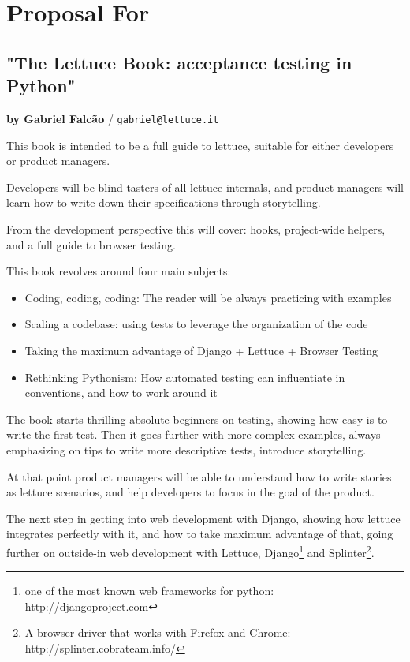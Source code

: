 \documentclass[letterpaper]{article}
\begin{document}
\section*{Proposal For}

\subsection*{"The Lettuce Book: acceptance testing in Python"}
\normalsize\textbf{by Gabriel Falcão} \large{/} \texttt{gabriel@lettuce.it}

\normalsize

This book is intended to be a full guide to lettuce, suitable for
either developers or product managers.

\noindent
Developers will be blind tasters of all lettuce internals, and product
managers will learn how to write down their specifications through
storytelling.

\noindent
From the development perspective this will cover: hooks, project-wide
helpers, and a full guide to browser testing.

\noindent
This book revolves around four main subjects:

\begin{itemize}

\item{Coding, coding, coding: The reader will be always practicing with examples}

\item{Scaling a codebase: using tests to leverage the organization of the code}

\item{Taking the maximum advantage of Django + Lettuce + Browser Testing}

\item{Rethinking Pythonism: How automated testing can influentiate in conventions, and how to work around it}
\end{itemize}

\noindent

The book starts thrilling absolute beginners on testing, showing how easy is to write the first test.
Then it goes further with more complex examples, always emphasizing on
tips to write more descriptive tests, introduce storytelling.

\noindent
At that point product managers will be able to understand how to write
stories as lettuce scenarios, and help developers to focus in the goal
of the product.

\noindent
The next step in getting into web development with Django, showing how
lettuce integrates perfectly with it, and how to take maximum
advantage of that, going further on outside-in web development with
Lettuce, Django\footnote{one of the most known web frameworks for python: http://djangoproject.com} and Splinter\footnote{A browser-driver that works with Firefox and Chrome: http://splinter.cobrateam.info/}.
\end{document}

